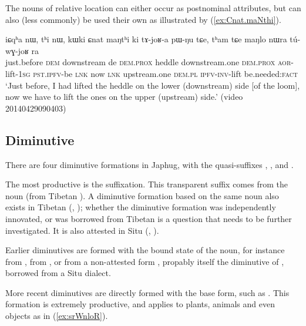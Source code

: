 The nouns of relative location can either occur as postnominal attributes, but can also (less commonly) be used their own as illustrated by (\ref{ex:Cnat.maNthi}).
\largerpage
\begin{exe}
\ex \label{ex:Cnat.maNthi}
\gll iɕqʰa nɯ, tʰi nɯ, kɯki ɕnat maŋtʰi ki tɤ-joʁ-a pɯ-ŋu tɕe, tʰam tɕe maŋlo nɯra tú-wɣ-joʁ ra \\
just.before \textsc{dem} downstream de \textsc{dem}.\textsc{prox} heddle downstream.one \textsc{dem}.\textsc{prox} \textsc{aor}-lift-\textsc{1sg} \textsc{pst}.\textsc{ipfv}-be \textsc{lnk} now \textsc{lnk} upstream.one \textsc{dem}.\textsc{pl} \textsc{ipfv}-\textsc{inv}-lift be.needed:\textsc{fact} \\
\glt `Just before, I had lifted the heddle on the lower (downstream) side [of the loom], now we have to lift the ones on the upper (upstream) side.' (video 20140429090403) 
\end{exe}
 
\subsection{Diminutive} \label{sec:diminutive}
There are four diminutive formations in Japhug, with the quasi-suffixes , ,  and .

The most productive is the  suffixation. This transparent suffix comes from the noun  (from Tibetan ). A diminutive formation based on the same noun also exists in Tibetan (\citealt{uray52diminutive}, \citealt[627]{hill14derivational}); whether the diminutive formation was independently innovated, or was borrowed from Tibetan is a question that needs to be further investigated. It is also attested in Situ (\citealt{zhang16bragdbar}, \citealt[151]{lai17khroskyabs}).

Earlier diminutives are formed with the bound state of the noun, for instance  from ,  from , or  from a non-attested form , propably itself the  diminutive of , borrowed from a Situ dialect.

More recent diminutives are directly formed with the base form, such as . This formation is extremely productive, and applies to plants, animals and even objects as in (\ref{ex:srWnloR}).

